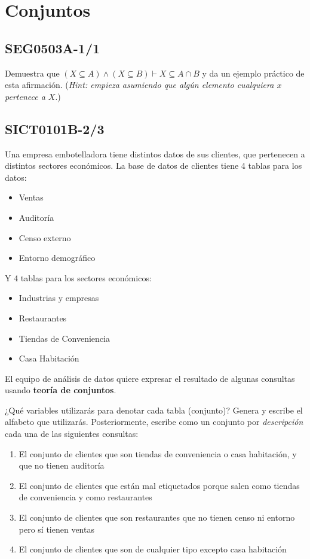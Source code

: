 \documentclass{article}
\begin{document}
\section{Conjuntos} 

\subsection{SEG0503A-1/1}

Demuestra que $(X \subseteq A) \wedge (X \subseteq B) \vdash X \subseteq A \cap B$ y da un ejemplo práctico de esta afirmación. (\textit{\footnotesize Hint: empieza asumiendo que algún elemento cualquiera $x$ pertenece a $X$}.)

\subsection{SICT0101B-2/3}

Una empresa embotelladora tiene distintos datos de sus clientes, que pertenecen a distintos sectores económicos.
La base de datos de clientes tiene 4 tablas para los datos:

\begin{itemize}
    \item Ventas
    \item Auditoría
    \item Censo externo
    \item Entorno demográfico
\end{itemize}
Y 4 tablas para los sectores económicos:
\begin{itemize}
    \item Industrias y empresas
    \item Restaurantes
    \item Tiendas de Conveniencia
    \item Casa Habitación
\end{itemize}

El equipo de análisis de datos quiere expresar el resultado de algunas consultas usando \textbf{teoría de conjuntos}.

¿Qué variables utilizarás para denotar cada tabla (conjunto)? Genera y escribe el alfabeto que utilizarás.
Posteriormente, escribe como un conjunto por \textit{descripción} cada una de las siguientes consultas:

\begin{enumerate}
    \item El conjunto de clientes que son tiendas de conveniencia o casa habitación, y que no tienen auditoría
    \item El conjunto de clientes que están mal etiquetados porque salen como tiendas de conveniencia y como restaurantes
    \item El conjunto de clientes que son restaurantes que no tienen censo ni entorno pero sí tienen ventas
    \item El conjunto de clientes que son de cualquier tipo excepto casa habitación
\end{enumerate}
\end{document}
